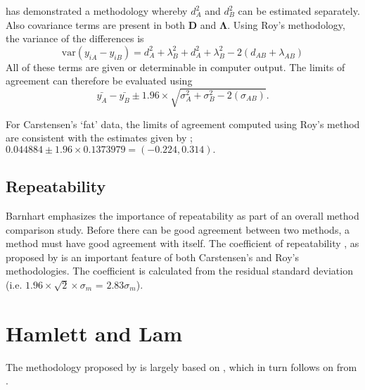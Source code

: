 \documentclass[]{article}
\begin{document}
\citet{roy} has demonstrated a methodology whereby $d^2_{A}$ and $d^2_{B}$ can be estimated separately. Also covariance terms are present in both $\boldsymbol{D}$ and $\boldsymbol{\Lambda}$. Using Roy's methodology, the variance of the differences is
\begin{equation}
\mbox{var} (y_{iA}-y_{iB})= d^2_{A} + \lambda^2_{B} + d^2_{A} + \lambda^2_{B} - 2(d_{AB} + \lambda_{AB})
\end{equation}
All of these terms are given or determinable in computer output.
The limits of agreement can therefore be evaluated using
\begin{equation}
\bar{y_{A}}-\bar{y_{B}} \pm 1.96 \times \sqrt{ \sigma^2_{A} + \sigma^2_{B}  - 2(\sigma_{AB})}.
\end{equation}

For Carstensen's `fat' data, the limits of agreement computed using Roy's
method are consistent with the estimates given by \citet{BXC2008}; $0.044884  \pm 1.96 \times  0.1373979 = (-0.224,  0.314).$


\newpage

\subsection{Repeatability}
Barnhart emphasizes the importance of repeatability as part of an overall method comparison study. Before there can be good agreement between two methods, a method must have good agreement with itself. The coefficient of repeatability , as proposed by \citet{BA99} is an important feature of both Carstensen's and Roy's methodologies. The coefficient is calculated from the residual standard deviation (i.e. $1.96 \times \sqrt{2} \times \sigma_m$ = $2.83 \sigma_m$).

\newpage
\section{Hamlett and Lam}
The methodology proposed by \citet{Roy2009} is largely based on \citet{hamlett}, which in turn follows on from \citet{lam}.


\end{document}
